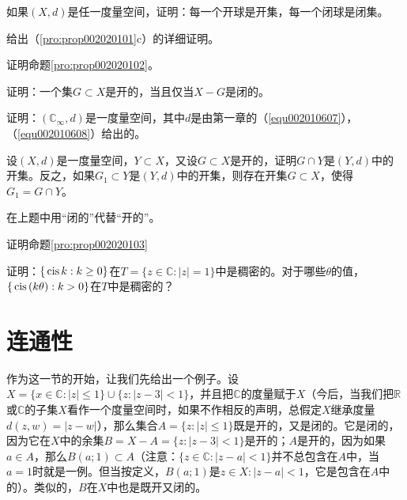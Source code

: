 \begin{exercise}
如果$(X, d)$是任一度量空间，证明：每一个开球是开集，每一个闭球是闭集。
\end{exercise}

\begin{exercise}
给出（\ref{pro:prop002020101}c）的详细证明。
\end{exercise}

\begin{exercise}
证明命题\ref{pro:prop002020102}。
\end{exercise}

\begin{exercise}
证明：一个集$G \subset X$是开的，当且仅当$X-G$是闭的。
\end{exercise}

\begin{exercise}
证明：$(\mathbb{C}_{\infty}, d)$是一度量空间，其中$d$是由第一章的（\ref{equ002010607}），（\ref{equ002010608}）给出的。
\end{exercise}

\begin{exercise}
设$(X, d)$是一度量空间，$Y \subset X$，又设$G \subset X$是开的，证明$G \cap Y$是$(Y, d)$中的开集。反之，如果$G_1 \subset Y$是$(Y, d)$中的开集，则存在开集$G \subset X$，使得$G_1 = G \cap Y$。
\end{exercise}

\begin{exercise}
在上题中用“闭的”代替“开的”。
\end{exercise}

\begin{exercise}
证明命题\ref{pro:prop002020103}
\end{exercise}

\begin{exercise}
证明：$\{\,\text{cis}\,{k}:k \ge 0\}$在$T=\{z \in \mathbb{C}:|z|=1\}$中是稠密的。对于哪些$\theta$的值，$\{\,\text{cis}\,(k\theta):k>0\}$在$T$中是稠密的？
\end{exercise}

\section{连通性}\label{subsection0020202}
作为这一节的开始，让我们先给出一个例子。设$X = \{ x \in \mathbb{C} : |z| \le 1\} \cup \{z: |z-3| < 1\}$，并且把$\mathbb{C}$的度量赋于$X$（今后，当我们把$\mathbb{R}$或$\mathbb{C}$的子集$X$看作一个度量空间时，如果不作相反的声明，总假定$X$继承度量$d(z, w) = |z-w|$），那么集合$A = \{z:|z| \le 1\}$既是开的，又是闭的。它是闭的，因为它在$X$中的余集$B = X-A = \{z:|z-3| < 1\}$是开的；$A$是开的，因为如果$a \in A$，那么$B(a;1) \subset A$（注意：$\{z \in \mathbb{C}: |z-a| < 1\}$并不总包含在$A$中，当$a=1$时就是一例。但当按定义，$B(a;1)$是$z \in X: |z-a|<1$，它是包含在$A$中的）。类似的，$B$在$X$中也是既开又闭的。

